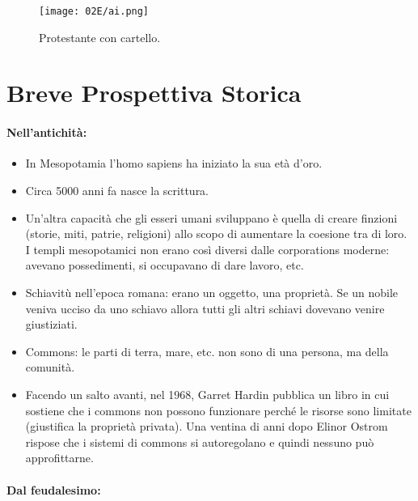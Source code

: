 \begin{figure}[H]
    \centering
    \texttt{[image: 02E/ai.png]}
    \caption{Protestante con cartello.}
\end{figure}

\section{Breve Prospettiva Storica}

\paragraph{Nell'antichità:}

\begin{itemize}
  \item In Mesopotamia l'homo sapiens ha iniziato la sua età d'oro. 
  \item Circa 5000 anni fa nasce la scrittura. 
  \item Un'altra capacità che gli esseri umani sviluppano è quella di creare finzioni (storie, miti, patrie, religioni) allo scopo di aumentare la coesione tra di loro. I templi mesopotamici non erano così diversi dalle corporations moderne: avevano possedimenti, si occupavano di dare lavoro, etc. 
  \item Schiavitù nell'epoca romana: erano un oggetto, una proprietà. Se un nobile veniva ucciso da uno schiavo allora tutti gli altri schiavi dovevano venire giustiziati. 
  \item Commons: le parti di terra, mare, etc. non sono di una persona, ma della comunità.
  \item Facendo un salto avanti, nel 1968, Garret Hardin pubblica un libro in cui sostiene che i commons non  possono funzionare perché le risorse sono limitate (giustifica la proprietà privata). Una ventina di anni dopo Elinor Ostrom rispose che i sistemi di commons si autoregolano e quindi nessuno può approfittarne.
\end{itemize}

\paragraph{Dal feudalesimo:}


